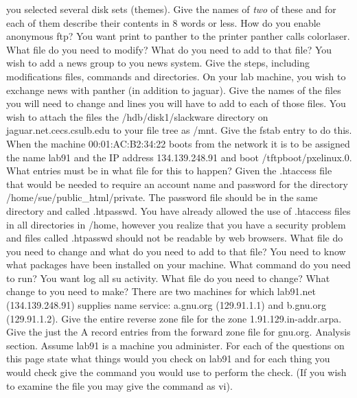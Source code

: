 you selected several disk sets (themes).
Give the names of {\it two} of these and for each of them
describe their contents in 8 words or less.
\vskip 1.4in
\ques
How do you enable anonymous ftp?
\vskip 0.8in
\ques
You want print to {\ltt{}panther} to the printer panther calls 
{\ltt{}colorlaser}.
What file do you need to modify?
What do you need to add to that file?
\vskip 0.8in
\ques
You wish to add a news group to you news system.
Give the steps, including modifications files, commands and directories.
\vskip 2.0in
\ques
On your lab machine, you wish to exchange news with {\ltt{}panther}
(in addition to {\ltt{}jaguar}).
Give the names of the files you will need to change and lines you
will have to add to each of those files.
\vskip 2.2in
\vfill\eject
\ques
You wish to attach the files the
{\ltt{}/hdb/disk1/slackware} directory on {\ltt{}jaguar.net.cecs.csulb.edu}
to your file tree as {\ltt{}/mnt}.
Give the {\ltt{}fstab} entry to do this.
\vskip 0.5in
\ques
When the machine {\ltt{}00:01:AC:B2:34:22} boots from the network
it is to be assigned the name {\ltt{}lab91} and the IP address
{\ltt{}134.139.248.91} and boot {\ltt{}/tftpboot/pxelinux.0}.
What entries must be in what file for this to happen?
\vskip 1.8in
\ques
Given the {\ltt{}.htaccess} file that would be needed to require an
account name and password for the directory
{\ltt{}/home/sue/public_html/private}.
The password file should be in the same directory and called {\ltt{}.htpasswd}.
\vskip 2.4in
\ques
You have already allowed the use of {\ltt{}.htaccess} files in all directories
in {\ltt{}/home}, however you realize that you have a security problem
and files called {\ltt{}.htpasswd} should not be readable by web browsers.
What file do you need to change and what do you need to add to that file?
\vskip 2.2in
\vfill\eject
\ques
You need to know what packages have been installed on your machine.
What command do you need to run?
\vskip 0.5in
\ques
You want log all {\ltt{}su} activity.
What file do you need to change?
What change to you need to make?
\vskip 1.0in
\ques
There are two machines for which {\ltt{}lab91.net} ({\ltt{}134.139.248.91})
supplies name service:
{\ltt{}a.gnu.org} ({\ltt{}129.91.1.1}) and 
{\ltt{}b.gnu.org} ({\ltt{}129.91.1.2}).
\hfill\break
Give the entire reverse zone file for the zone {\ltt{}1.91.129.in-addr.arpa}.
\vfill
\ques
Give the just the {\ltt{}A} record entries from the forward zone file for
{\ltt{}gnu.org}.
\vskip 1.2in
\eject
Analysis section. Assume {\ltt{}lab91} is a machine you administer.
For each of the questions on this page
state what things would you check on {\ltt{}lab91}
and for each thing you would check give the command you would use to
perform the check. (If you wish to examine the file you may give the
command as {\ltt{}vi}).

